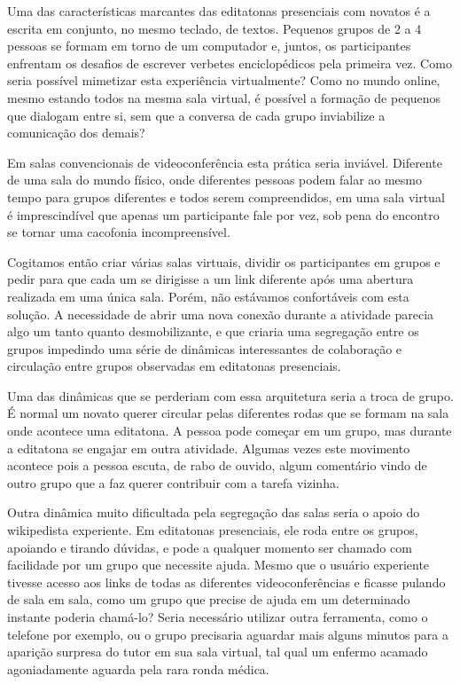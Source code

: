 Uma das características marcantes das editatonas presenciais com novatos é a escrita em conjunto, no mesmo teclado, de textos. Pequenos grupos de 2 a 4 pessoas se formam em torno de um computador e, juntos, os participantes enfrentam os desafios de escrever verbetes enciclopédicos pela primeira vez. Como seria possível mimetizar esta experiência virtualmente? Como no mundo online, mesmo estando todos na mesma sala virtual, é possível a formação de pequenos que dialogam entre si, sem que a conversa de cada grupo inviabilize a comunicação dos demais?

Em salas convencionais de videoconferência esta prática seria inviável. Diferente de uma sala do mundo físico, onde diferentes pessoas podem falar ao mesmo tempo para grupos diferentes e todos serem compreendidos, em uma sala virtual é imprescindível que apenas um participante fale por vez, sob pena do encontro se tornar uma cacofonia incompreensível.

Cogitamos então criar várias salas virtuais, dividir os participantes em grupos e pedir para que cada um se dirigisse a um link diferente após uma abertura realizada em uma única sala. Porém, não estávamos confortáveis com esta solução. A necessidade de abrir uma nova conexão durante a atividade parecia algo um tanto quanto desmobilizante, e que criaria uma segregação entre os grupos impedindo uma série de dinâmicas interessantes de colaboração e circulação entre grupos observadas em editatonas presenciais.

Uma das dinâmicas que se perderiam com essa arquitetura seria a troca de grupo. É normal um novato querer circular pelas diferentes rodas que se formam na sala onde acontece uma editatona. A pessoa pode começar em um grupo, mas durante a editatona se engajar em outra atividade. Algumas vezes este movimento acontece pois a pessoa escuta, de rabo de ouvido, algum comentário vindo de outro grupo que a faz querer contribuir com a tarefa vizinha.

Outra dinâmica muito dificultada pela segregação das salas seria o apoio do wikipedista experiente. Em editatonas presenciais, ele roda entre os grupos, apoiando e tirando dúvidas, e pode a qualquer momento ser chamado com facilidade por um grupo que necessite ajuda. Mesmo que o usuário experiente tivesse acesso aos links de todas as diferentes videoconferências e ficasse pulando de sala em sala, como um grupo que precise de ajuda em um determinado instante poderia chamá-lo? Seria necessário utilizar outra ferramenta, como o telefone por exemplo, ou o grupo precisaria aguardar mais alguns minutos para a aparição surpresa do tutor em sua sala virtual, tal qual um enfermo acamado agoniadamente aguarda pela rara ronda médica.

